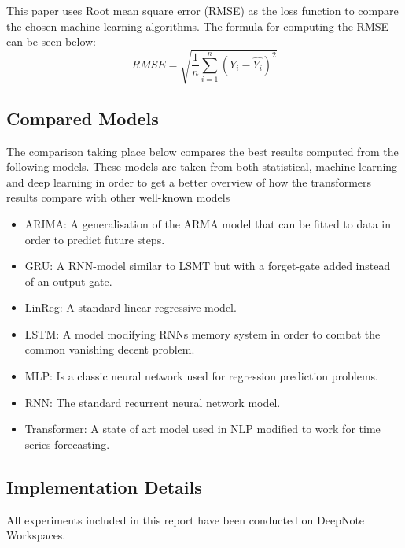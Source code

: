 This paper uses Root mean square error (RMSE) as the loss function to compare the chosen machine learning algorithms. The formula for computing the RMSE can be seen below: 
$$RMSE = \sqrt{\frac 1 n \displaystyle\sum_{i=1}^n(Y_i - \hat{Y_i})^2}$$

\subsection{Compared Models}
The comparison taking place below compares the best results computed from the following models. These models are taken from both statistical, machine learning and deep learning in order to get a better overview of how the transformers results compare with other well-known models
\begin{itemize}
    \item ARIMA: A generalisation of the ARMA model that can be fitted to data in order to predict future steps.
    \item GRU: A RNN-model similar to LSMT but with a forget-gate added instead of an output gate.
    \item LinReg: A standard linear regressive model.
    \item LSTM: A model modifying RNNs memory system in order to combat the common vanishing decent problem.
    \item MLP: Is a classic neural network used for regression prediction problems.
    \item RNN: The standard recurrent neural network model.
    \item Transformer: A state of art model used in NLP modified to work for time series forecasting.
\end{itemize}

\subsection{Implementation Details}
All experiments included in this report have been conducted on DeepNote Workspaces.

